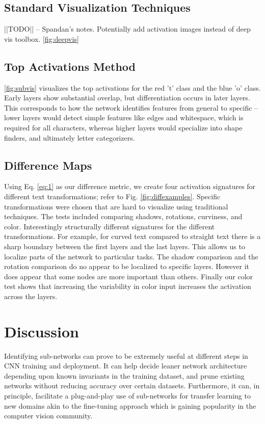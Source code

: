 \documentclass[10pt,twocolumn,letterpaper]{article}
\begin{document}
\subsection{Standard Visualization Techniques}
||TODO|| -- Spandan's notes. Potentially add activation images instead of deep vis toolbox.
\ref{fig:deepvis}

\subsection{Top Activations Method}
\ref{fig:subvis} visualizes the top activations for the red 't' class and the blue 'o' class. Early layers show substantial overlap, but differentiation occurs in later layers. This corresponds to how the network identifies features from general to specific -- lower layers would detect simple features like edges and whitespace, which is required for all characters, whereas higher layers would specialize into shape finders, and ultimately letter categorizers. 

\subsection{Difference Maps}
Using Eq. \ref{eq:1} as our difference metric, we create four activation signatures for different text transformations; refer to Fig. \ref{fig:diffexamples}. Specific transformations were chosen that are hard to visualize using traditional techniques. The tests included comparing shadows, rotations, curviness, and color. Interestingly structurally different signatures for the different transformations. For example, for curved text compared to straight text there is a sharp boundary between the first layers and the last layers. This allows us to localize parts of the network to particular tasks. The shadow comparison and the rotation comparison do no appear to be localized to specific layers. However it does appear that some nodes are more important than others. Finally our color test shows that increasing the variability in color input increases the activation across the layers.




\section{Discussion}
Identifying sub-networks can prove to be extremely useful at different steps in CNN training and deployment. It can help decide leaner network architecture depending upon known invariants in the training dataset, and prune existing networks without reducing accuracy over certain datasets. Furthermore, it can, in principle, facilitate a plug-and-play use of sub-networks for transfer learning to new domains akin to the fine-tuning approach which is gaining popularity in the computer vision community.
\end{document}
